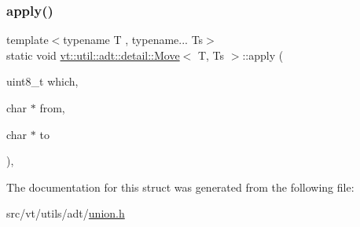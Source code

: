 \subsubsection{\texorpdfstring{apply()}{apply()}}
{\footnotesize\ttfamily template$<$typename T , typename... Ts$>$ \\
static void \hyperlink{structvt_1_1util_1_1adt_1_1detail_1_1_move}{vt\+::util\+::adt\+::detail\+::\+Move}$<$ T, Ts $>$\+::apply (\begin{DoxyParamCaption}\item[{uint8\+\_\+t}]{which,  }\item[{char $\ast$}]{from,  }\item[{char $\ast$}]{to }\end{DoxyParamCaption})\hspace{0.3cm}{\ttfamily [inline]}, {\ttfamily [static]}}



The documentation for this struct was generated from the following file\+:\begin{DoxyCompactItemize}
\item 
src/vt/utils/adt/\hyperlink{union_8h}{union.\+h}\end{DoxyCompactItemize}
